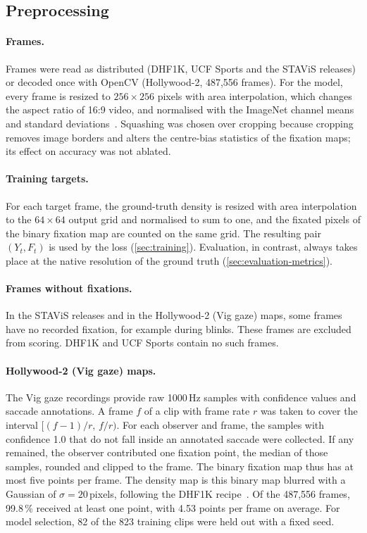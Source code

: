 \subsection{Preprocessing}

\paragraph{Frames.} Frames were read as distributed (DHF1K, UCF Sports and the
STAViS releases) or decoded once with OpenCV (Hollywood-2, 487,556 frames).
For the model, every frame is resized to $256\times256$ pixels with area
interpolation, which changes the aspect ratio of 16:9 video, and normalised
with the ImageNet channel means and standard deviations~\cite{deng2009imagenet}.
Squashing was chosen over cropping because cropping removes image borders and
alters the centre-bias statistics of the fixation maps; its effect on accuracy
was not ablated.

\paragraph{Training targets.} For each target frame, the ground-truth density
is resized with area interpolation to the $64\times64$ output grid and
normalised to sum to one, and the fixated pixels of the binary fixation map
are counted on the same grid. The resulting pair $(Y_t,F_t)$ is used by the
loss (\cref{sec:training}). Evaluation, in contrast, always takes place at
the native resolution of the ground truth (\cref{sec:evaluation-metrics}).

\paragraph{Frames without fixations.} In the STAViS releases and in the
Hollywood-2 (Vig gaze) maps, some frames have no recorded fixation, for
example during blinks. These frames are excluded from scoring. DHF1K and UCF
Sports contain no such frames.

\paragraph{Hollywood-2 (Vig gaze) maps.} The Vig gaze recordings provide raw
1000\,Hz samples with confidence values and saccade annotations. A frame $f$
of a clip with frame rate $r$ was taken to cover the interval
$[(f-1)/r,\,f/r)$. For each observer and frame, the samples with confidence
1.0 that do not fall inside an annotated saccade were collected. If any
remained, the observer contributed one fixation point, the median of those
samples, rounded and clipped to the frame. The binary fixation map thus has
at most five points per frame. The density map is this binary map blurred
with a Gaussian of $\sigma=20$\,pixels, following the DHF1K
recipe~\cite{wang2018revisiting}. Of the 487,556 frames, 99.8\,\% received at
least one point, with 4.53 points per frame on average. For model selection,
82 of the 823 training clips were held out with a fixed seed.


